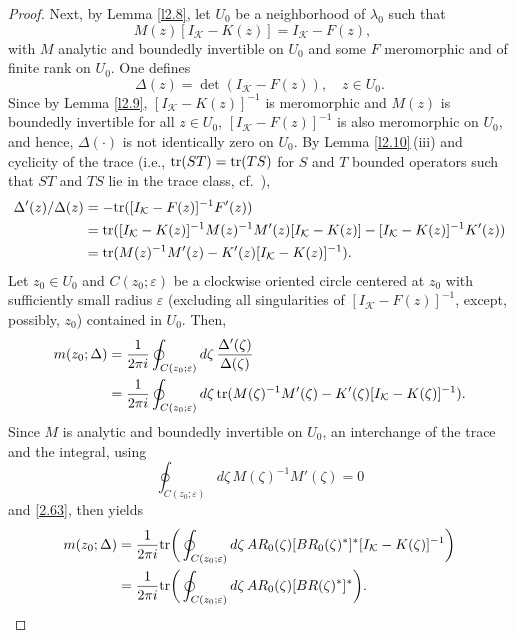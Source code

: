 \documentclass[reqno,10pt, centertags]{amsart}
\newcommand{\cK}{{\mathcal K}}
\newcommand{\no}{\nonumber}
\newcommand{\lb}{\label}
\newcommand{\f}{\frac}
\newcommand{\tr}{\text{\rm{tr}}}
\numberwithin{equation}{section}
\theoremstyle{definition}
\begin{document}
\begin{proof}
Next, by Lemma \ref{l2.8}, let $U_0$ be a neighborhood of $\lambda_0$
such that
\begin{equation}
M(z)[I_{\cK}-K(z)]=I_{\cK}-F(z), \quad \lb{2.67}
\end{equation}
with $M$ analytic and boundedly invertible on $U_0$ and some
$F$ meromorphic and of finite rank on $U_0$. One defines
\begin{equation}
\Delta(z)=\det(I_{\cK}-F(z)), \quad z\in U_0. \lb{2.68}
\end{equation}
Since by Lemma \ref{l2.9}, $[I_{\cK}-K(z)]^{-1}$ is meromorphic
and $M(z)$ is boundedly invertible for all $z\in U_0$,
$[I_{\cK}-F(z)]^{-1}$ is also meromorphic on $U_0$, and hence,
$\Delta(\cdot)$ is not identically zero on $U_0$. By Lemma
\ref{l2.10}\,(iii) and cyclicity of the trace (i.e., $\tr(ST)=\tr(TS)$ for
$S$ and $T$ bounded operators such that $ST$ and $TS$ lie in the trace
class, cf.\ \cite[Corollary 3.8]{Si79}),
\begin{align}
\Delta'(z)/\Delta(z)&=-\tr([I_{\cK}-F(z)]^{-1}F'(z)) \no \\
&=\tr([I_{\cK}-K(z)]^{-1}M(z)^{-1}M'(z)[I_{\cK}-K(z)]-
[I_{\cK}-K(z)]^{-1}K'(z)) \no \\
&=\tr(M(z)^{-1}M'(z)-K'(z)[I_{\cK}-K(z)]^{-1}). \lb{2.69}
\end{align}
Let $z_0\in U_0$ and $C(z_0; \varepsilon)$ be a clockwise oriented
circle centered at $z_0$ with sufficiently small radius
$\varepsilon$ (excluding all singularities of $[I_{\cK}-F(z)]^{-1}$,
except, possibly, $z_0$) contained in $U_0$. Then,
\begin{align}
m(z_0;\Delta)&=\f{1}{2\pi i} \oint_{C(z_0; \varepsilon) } d\zeta \,
\f{\Delta'(\zeta)}{\Delta(\zeta)} \no \\
&= \f{1}{2\pi i} \oint_{C(z_0; \varepsilon) } d\zeta \,
\tr(M(\zeta)^{-1}M'(\zeta)-K'(\zeta)[I_{\cK}-K(\zeta)]^{-1}).
\lb{2.70}
\end{align}
Since $M$ is analytic and boundedly invertible on $U_0$, an interchange of
the trace and the integral, using
\begin{equation}
\oint_{C(z_0; \varepsilon) } d\zeta \,
M(\zeta)^{-1}M'(\zeta) =0
\end{equation}
and \eqref{2.63}, then yields
\begin{align}
m(z_0;\Delta)&= \f{1}{2\pi i} \tr\bigg(\oint_{C(z_0; \varepsilon) }
d\zeta \, AR_0(\zeta)[BR_0(\zeta)^*]^*[I_{\cK}-K(\zeta)]^{-1}
\bigg)
\no \\
&=\f{1}{2\pi i} \tr\bigg(\oint_{C(z_0; \varepsilon) } d\zeta \,
AR_0(\zeta)[BR(\zeta)^*]^*\bigg). \lb{2.71}

\end{align}
\end{proof}
\end{document}
